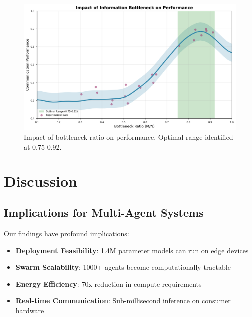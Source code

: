 \documentclass[10pt,twocolumn]{article}
\begin{document}
\begin{figure}[h]
    \centering
    \includegraphics[width=\columnwidth]{figures/bottleneck_analysis.png}
    \caption{Impact of bottleneck ratio on performance. Optimal range identified at 0.75-0.92.}
    \label{fig:bottleneck}
\end{figure}

\section{Discussion}

\subsection{Implications for Multi-Agent Systems}

Our findings have profound implications:
\begin{itemize}
    \item \textbf{Deployment Feasibility}: 1.4M parameter models can run on edge devices
    \item \textbf{Swarm Scalability}: 1000+ agents become computationally tractable
    \item \textbf{Energy Efficiency}: 70x reduction in compute requirements
    \item \textbf{Real-time Communication}: Sub-millisecond inference on consumer hardware
\end{itemize}
\end{document}
